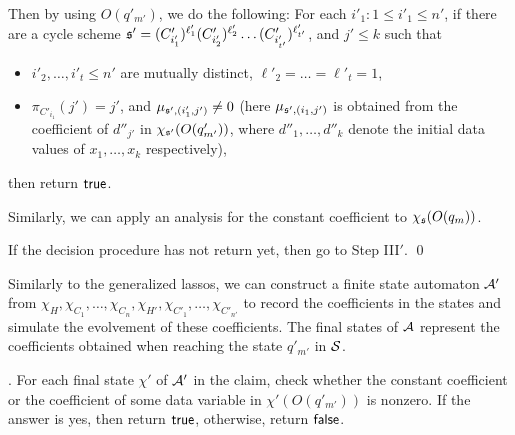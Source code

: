 Then by using $O(q'_{m'})$, we do the following: For each $i'_1: 1 \le i'_1 \le n'$, if there are a cycle scheme ${\mathfrak{s} }' =(C'_{i'_1})^{\ell'_1} (C'_{i'_2})^{\ell'_2} \dots (C'_{i'_{t'}})^{\ell'_{t'}}$, and $j' \le k$ such that
\begin{itemize}
\item $i'_2,\dots,i'_t \le n'$ are mutually distinct, $\ell'_2 = \dots = \ell'_t = 1$, 
%
\item $\pi_{C'_{i_1}}(j')=j'$, and $\mu_{{\mathfrak{s} }',(i'_1,j')} \neq 0$ (here $\mu_{{\mathfrak{s} }',(i_1,j')}$ is obtained from the coefficient of $d''_{j'}$ in  $\chi_{{\mathfrak{s} }'}(O(q'_{m'}))$, where $d''_1,\dots,d''_k$ denote the initial data values of $x_1,\dots,x_k$ respectively),
\end{itemize}
then return $\mathsf{true}$. 

Similarly, we can apply an analysis for the constant coefficient to $\chi_{\mathfrak{s} }(O(q_m))$. 

If the decision procedure has not return yet, then go to Step III$'$. \qed

\smallskip

Similarly to the generalized lassos, we can construct a finite state automaton ${\mathcal{A} }'$ from $\chi_H,\chi_{C_1},\dots,\chi_{C_n},\chi_{H'}, \chi_{C'_1},\dots,\chi_{C'_{n'}}$ to record the coefficients in the states and simulate the evolvement of these coefficients. The final states of ${\mathcal{A} }$ represent the coefficients obtained when reaching the state $q'_{m'}$ in ${\mathcal{S} }$. 

\smallskip 

. For each final state $\chi'$ of ${\mathcal{A} }'$ in the claim, check whether the constant coefficient or the coefficient of some data variable in $\chi'(O(q'_{m'}))$ is nonzero. If the answer is yes, then return $\mathsf{true}$, otherwise, return $\mathsf{false}$.

